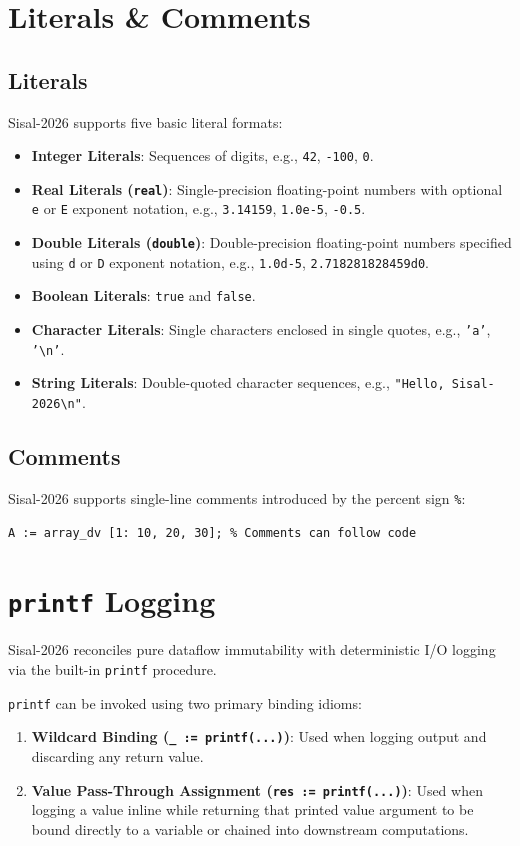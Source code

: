 \section{Literals \& Comments}
\subsection{Literals}
Sisal-2026 supports five basic literal formats:
\begin{itemize}
    \item \textbf{Integer Literals}: Sequences of digits, e.g., \texttt{42}, \texttt{-100}, \texttt{0}.
    \item \textbf{Real Literals (\texttt{real})}: Single-precision floating-point numbers with optional \texttt{e} or \texttt{E} exponent notation, e.g., \texttt{3.14159}, \texttt{1.0e-5}, \texttt{-0.5}.
    \item \textbf{Double Literals (\texttt{double})}: Double-precision floating-point numbers specified using \texttt{d} or \texttt{D} exponent notation, e.g., \texttt{1.0d-5}, \texttt{2.718281828459d0}.
    \item \textbf{Boolean Literals}: \texttt{true} and \texttt{false}.
    \item \textbf{Character Literals}: Single characters enclosed in single quotes, e.g., \texttt{'a'}, \texttt{'\textbackslash n'}.
    \item \textbf{String Literals}: Double-quoted character sequences, e.g., \texttt{"Hello, Sisal-2026\textbackslash n"}.
\end{itemize}

\subsection{Comments}
Sisal-2026 supports single-line comments introduced by the percent sign \texttt{\%}:
\begin{lstlisting}[caption={Comment Syntax}]
% This is a single-line comment in Sisal-2026
A := array_dv [1: 10, 20, 30]; % Comments can follow code
\end{lstlisting}

\section{\texttt{printf} Logging}
Sisal-2026 reconciles pure dataflow immutability with deterministic I/O logging via the built-in \texttt{printf} procedure.

\texttt{printf} can be invoked using two primary binding idioms:
\begin{enumerate}
    \item \textbf{Wildcard Binding (\texttt{\_ := printf(...)})}: Used when logging output and discarding any return value.
    \item \textbf{Value Pass-Through Assignment (\texttt{res := printf(...)})}: Used when logging a value inline while returning that printed value argument to be bound directly to a variable or chained into downstream computations.
\end{enumerate}

